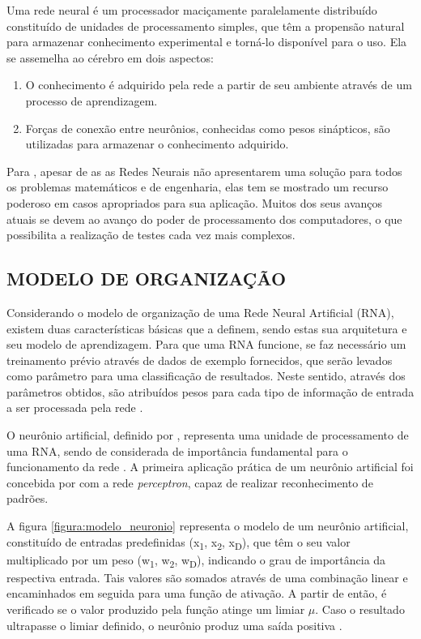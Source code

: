 \begin{citacao}
	Uma rede neural é um processador maciçamente paralelamente distribuído constituído de unidades de processamento simples, que têm a propensão natural para armazenar conhecimento experimental e torná-lo disponível para o uso. Ela se assemelha ao cérebro em dois aspectos:
	\begin{enumerate}[leftmargin=4.7cm, topsep=0cm]
	    \item O conhecimento é adquirido pela rede a partir de seu ambiente através de um processo de aprendizagem.
	    \item Forças de conexão entre neurônios, conhecidas como pesos sinápticos, são utilizadas para armazenar o conhecimento adquirido.
	\end{enumerate}
\end{citacao}

Para , apesar de as as Redes Neurais não apresentarem uma solução para todos os problemas matemáticos e de engenharia, elas tem se mostrado um recurso poderoso em casos apropriados para sua aplicação. Muitos dos seus avanços atuais se devem ao avanço do poder de processamento dos computadores, o que possibilita a realização de testes cada vez mais complexos.

\subsection{MODELO DE ORGANIZAÇÃO}

Considerando o modelo de organização de uma Rede Neural Artificial (RNA), existem duas características básicas que a definem, sendo estas sua arquitetura e seu modelo de aprendizagem. Para que uma RNA funcione, se faz necessário um treinamento prévio através de dados de exemplo fornecidos, que serão levados como parâmetro para uma classificação de resultados. Neste sentido, através dos parâmetros obtidos, são atribuídos pesos para cada tipo de informação de entrada a ser processada pela rede \cite{thomas2019}.

O neurônio artificial, definido por , representa uma unidade de processamento de uma RNA, sendo de considerada de importância fundamental para o funcionamento da rede \cite{haykin2007redes}. A primeira aplicação prática de um neurônio artificial foi concebida por  com a rede \textit{perceptron}, capaz de realizar reconhecimento de padrões.

A figura \ref{figura:modelo_neuronio} representa o modelo de um neurônio artificial, constituído de entradas predefinidas (x\textsubscript{1}, x\textsubscript{2}, x\textsubscript{D}), que têm o seu valor multiplicado por um peso (w\textsubscript{1}, w\textsubscript{2}, w\textsubscript{D}), indicando o grau de importância da respectiva entrada. Tais valores são somados através de uma combinação linear e encaminhados em seguida para uma função de ativação. A partir de então, é verificado se o valor produzido pela função atinge um limiar \(\mu\). Caso o resultado ultrapasse o limiar definido, o neurônio produz uma saída positiva \cite{thomas2019}.

